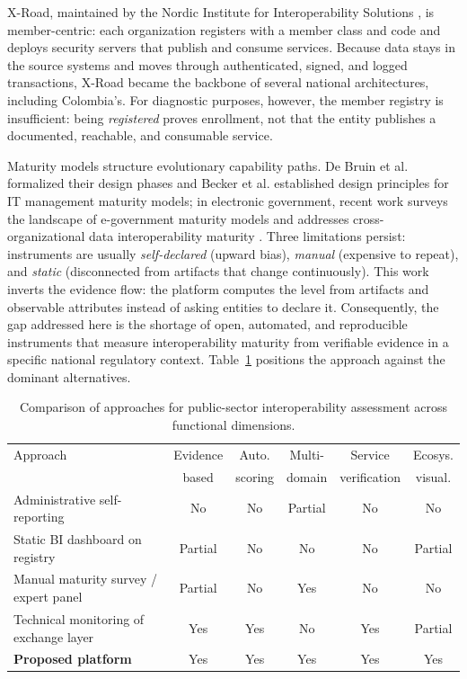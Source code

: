 \documentclass[runningheads]{llncs}
\begin{document}
X-Road, maintained by the Nordic Institute for Interoperability Solutions
\cite{niis2026}, is member-centric: each organization registers with a member
class and code and deploys security servers that publish and consume
services. Because data stays in the source systems and moves through
authenticated, signed, and logged transactions, X-Road became the backbone of
several national architectures, including Colombia's. For diagnostic
purposes, however, the member registry is insufficient: being
\emph{registered} proves enrollment, not that the entity publishes a
documented, reachable, and consumable service.

Maturity models structure evolutionary capability paths. De Bruin et al.
\cite{debruin2005} formalized their design phases and Becker et al.
\cite{becker2009} established design principles for IT management maturity
models; in electronic government, recent work surveys the landscape of
e-government maturity models \cite{okan2024} and addresses
cross-organizational data interoperability maturity \cite{wahyuni2024}. Three
limitations persist: instruments are usually \emph{self-declared} (upward
bias), \emph{manual} (expensive to repeat), and \emph{static}
(disconnected from artifacts that change continuously). This work inverts the
evidence flow: the platform computes the level from artifacts and observable
attributes instead of asking entities to declare it. Consequently, the gap
addressed here is the shortage of open, automated, and reproducible
instruments that measure interoperability maturity from verifiable evidence
in a specific national regulatory context. Table~\ref{tab:comparison}
positions the approach against the dominant alternatives.

\begin{table}[t]
\caption{Comparison of approaches for public-sector interoperability
assessment across functional dimensions.}
\label{tab:comparison}
\centering
\setlength{\tabcolsep}{3pt}
\scriptsize
\begin{tabular}{p{4.3cm}ccccc}
\toprule
Approach & Evidence & Auto. & Multi- & Service & Ecosys. \\
         & based    & scoring & domain & verification & visual. \\
\midrule
Administrative self-reporting & No & No & Partial & No & No \\
Static BI dashboard on registry & Partial & No & No & No & Partial \\
Manual maturity survey / expert panel & Partial & No & Yes & No & No \\
Technical monitoring of exchange layer & Yes & Yes & No & Yes & Partial \\
\textbf{Proposed platform} & Yes & Yes & Yes & Yes & Yes \\
\bottomrule
\end{tabular}
\end{table}
\end{document}
